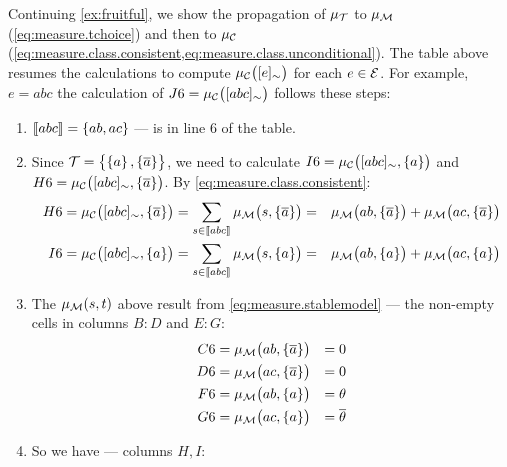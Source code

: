 \documentclass[x11names]{tlp}
\begin{document}
\begin{example}
		Continuing \cref{ex:fruitful}, we show the propagation of $\pwT$ to $\pwM$
		(\cref{eq:measure.tchoice}) and then to $\pwC$
		(\cref{eq:measure.class.consistent,eq:measure.class.unconditional}). The
		table above resumes the calculations to compute $\pwc{\class{e}}$ for each $e
			\in \EVENTSset$. For example, $e = abc$ the calculation of $J6 =
			\pwc{\class{abc}}$ follows these steps:
		\begin{enumerate}
			\item $\left\llbracket abc \right\rrbracket = \set{ab,ac}$ --- is in line $6$ of the table.
			\item Since $\TCHOICEset = \set{\set{a}, \set{\co{a}}}$, we need to calculate $I6 =
				      \pwc{\class{abc}, \set{a}}$ and $H6 = \pwc{\class{abc}, \set{\co{a}}}$. By
			      \cref{eq:measure.class.consistent}:
			      \begin{equation*}
				      \begin{aligned}
					      H6 = \pwc{\class{abc}, \set{\co{a}}}
					       & = \sum_{s \in \stablecore{abc}} \pwm{s, \set{\co{a}}}
					      =
					       & \pwm{ab, \set{\co{a}}} +  \pwm{ac, \set{\co{a}}}      %
					      \\
					      I6 = \pwc{\class{abc}, \set{a}}
					       & = \sum_{s \in \stablecore{abc}} \pwm{s, \set{a}}
					      =
					       & \pwm{ab, \set{a}} +  \pwm{ac, \set{a}}
				      \end{aligned}
			      \end{equation*}
			\item The $\pwm{s,t}$ above result from \cref{eq:measure.stablemodel} --- the
			      non-empty cells in columns $B:D$ and $E:G$:
			      \begin{equation*}
				      \begin{aligned}
					      C6
					       & = \pwm{ab, \set{\co{a}}}
					       & = 0                      %
					      \\
					      D6
					       & = \pwm{ac, \set{\co{a}}}
					       & = 0                      %
					      \\
					      F6
					       & = \pwm{ab, \set{a}}
					       & = \theta                 %
					      \\
					      G6
					       & = \pwm{ac, \set{a}}
					       & = \co{\theta}
				      \end{aligned}
			      \end{equation*}
			\item So we have --- columns $H, I$:
			      \begin{equation*}

\end{equation*}
\end{enumerate}
\end{example}
\end{document}
